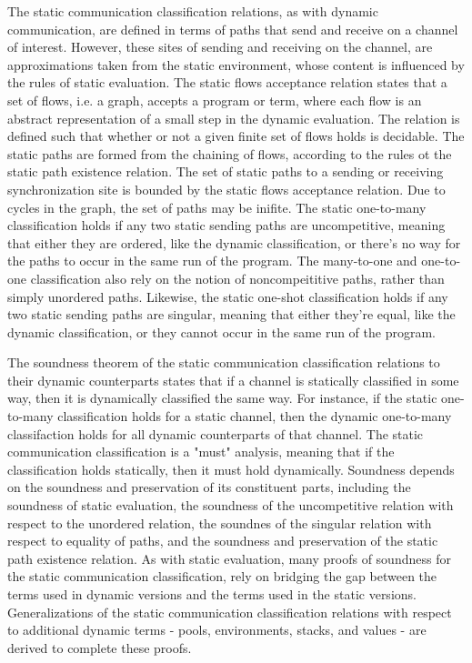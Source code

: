 \documentclass[letterpaper, 11pt]{report}
\begin{document}
The static communication classification relations, as with dynamic communication, are defined in terms of paths
that send and receive on a channel of interest. However, these sites of sending and receiving on the channel, are approximations
taken from the static environment, whose content is influenced by the rules of static evaluation.
The static flows acceptance relation states that a set of flows, i.e. a graph, accepts a program or term, where each flow is
an abstract representation of a small step in the dynamic evaluation. The relation is defined such that
whether or not a given finite set of flows holds is decidable. The static paths are formed from the chaining of flows, according
to the rules ot the static path existence relation.
The set of static paths to a sending or receiving synchronization site is bounded by the static flows acceptance
relation. Due to cycles in the graph, the set of paths may be inifite. 
The static one-to-many classification holds if any two static sending paths are uncompetitive, meaning
that either they are ordered, like the dynamic classification, or there's no way for the paths to occur in the same run
of the program. The many-to-one and one-to-one classification also rely on the notion of noncompeititive paths, rather than
simply unordered paths. Likewise, the static one-shot classification holds if any two static sending paths are singular,
meaning that either they're equal, like the dynamic classification, or they cannot occur in the same run of the program.

The soundness theorem of the static communication classification relations to their dynamic counterparts states that if
a channel is statically classified in some way, then it is dynamically classified the same way. For instance, if the
static one-to-many classification holds for a static channel, then the dynamic one-to-many classifaction holds for
all dynamic counterparts of that channel. The static communication classification is a "must" analysis, meaning that
if the classification holds statically, then it must hold dynamically. Soundness depends on the soundness and preservation
of its constituent parts,
including the soundness of static evaluation, the soundness of the uncompetitive relation with respect to
the unordered relation, the soundnes of the singular relation with respect to equality of paths,
and the soundness and preservation of the static path existence relation. As with static evaluation, many proofs of
soundness for the static communication classification, rely on bridging the gap between the terms used in dynamic
versions and the terms used in the static versions. Generalizations of the static communication classification relations
with respect to additional dynamic terms - pools, environments, stacks, and values - are derived to complete these proofs.
\end{document}
